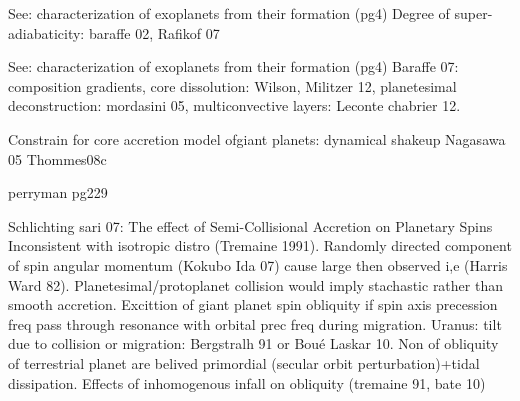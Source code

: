 \begin{workout}
See: characterization of exoplanets from their formation (pg4)
Degree of super-adiabaticity: baraffe 02, Rafikof 07
\end{workout}

\begin{workout}
See: characterization of exoplanets from their formation (pg4)
Baraffe 07: composition gradients, core dissolution: Wilson, Militzer 12, planetesimal deconstruction: mordasini 05, multiconvective layers: Leconte chabrier 12.
\end{workout}

\begin{workout}

\end{workout}

\begin{workout}
Constrain for core accretion model ofgiant planets: dynamical shakeup Nagasawa 05 Thommes08c
\end{workout}

\begin{workout}
perryman pg229
\end{workout}


\begin{workout}

\end{workout}

\begin{workout}
Schlichting sari 07: The effect of Semi-Collisional Accretion on Planetary Spins
Inconsistent with isotropic distro (Tremaine 1991). Randomly directed component of spin angular momentum (Kokubo Ida 07) cause large then observed i,e (Harris Ward 82).
Planetesimal/protoplanet collision would imply stachastic rather than smooth accretion.
Excittion of giant planet spin obliquity if spin axis precession freq pass through resonance with orbital prec freq during migration.
Uranus: tilt due to collision or migration: Bergstralh 91 or Bou\'e Laskar 10.
Non of obliquity of terrestrial planet are belived primordial (secular orbit perturbation)+tidal dissipation.
Effects of inhomogenous infall on obliquity (tremaine 91, bate 10)
\end{workout}


